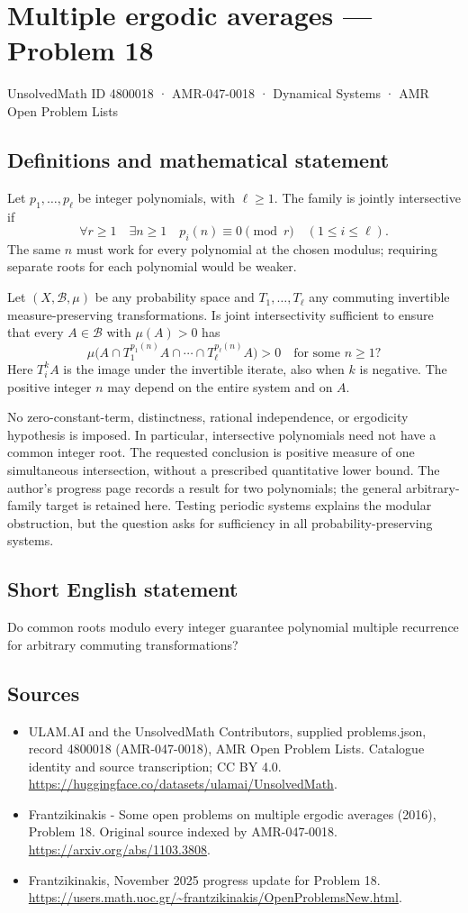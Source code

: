 \documentclass[11pt,a4paper]{article}
\begin{document}
\section*{Multiple ergodic averages — Problem 18}\label{4800018}
{\small UnsolvedMath ID 4800018 · AMR-047-0018 · Dynamical Systems · AMR Open Problem Lists}
\subsection{Definitions and mathematical statement}
Let $p_1,\ldots,p_\ell$ be integer polynomials, with
$\ell\ge1$. The family is jointly intersective if
\[
       \forall r\ge1\quad\exists n\ge1\quad
                p_i(n)\equiv0\pmod r\quad(1\le i\le\ell).
\]
The same $n$ must work for every polynomial at the
chosen modulus; requiring separate roots for each
polynomial would be weaker.

Let $(X,\mathcal B,\mu)$ be any probability space and
$T_1,\ldots,T_\ell$ any commuting invertible
measure-preserving transformations. Is joint
intersectivity sufficient to ensure that every
$A\in\mathcal B$ with $\mu(A)>0$ has
\[
           \mu\bigl(A\cap T_1^{p_1(n)}A\cap\cdots
                            \cap T_\ell^{p_\ell(n)}A\bigr)>0
                   \quad\text{for some }n\ge1?
\]
Here $T_i^kA$ is the image under the invertible
iterate, also when $k$ is negative. The positive
integer $n$ may depend on the entire system and
on $A$.

No zero-constant-term, distinctness, rational
independence, or ergodicity hypothesis is imposed.
In particular, intersective polynomials need not
have a common integer root. The requested conclusion
is positive measure of one simultaneous intersection,
without a prescribed quantitative lower bound.
The author's progress page records a result for two
polynomials; the general arbitrary-family target is
retained here. Testing periodic systems explains
the modular obstruction, but the question asks for
sufficiency in all probability-preserving systems.
\subsection{Short English statement}
Do common roots modulo every integer guarantee polynomial multiple recurrence for arbitrary commuting transformations?
\subsection{Sources}
\begin{itemize}
\item[S1] ULAM.AI and the UnsolvedMath Contributors, supplied problems.json, record 4800018 (AMR-047-0018), AMR Open Problem Lists. Catalogue identity and source transcription; CC BY 4.0.
\url{https://huggingface.co/datasets/ulamai/UnsolvedMath}.
\item[S2] Frantzikinakis - Some open problems on multiple ergodic averages (2016), Problem 18. Original source indexed by AMR-047-0018.
\url{https://arxiv.org/abs/1103.3808}.
\item[S3] Frantzikinakis, November 2025 progress update for Problem 18.
\url{https://users.math.uoc.gr/~frantzikinakis/OpenProblemsNew.html}.
\end{itemize}
\end{document}
